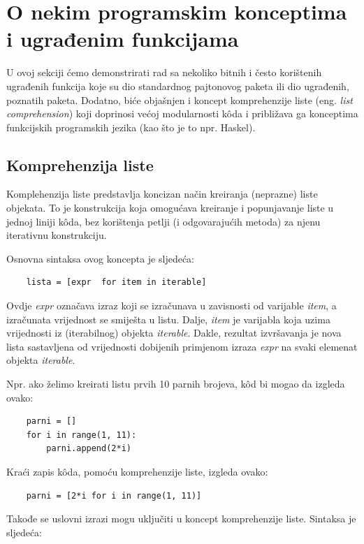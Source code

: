 \section{O nekim programskim konceptima i ugrađenim funkcijama} \label{sec:concepts-pyhton}

U ovoj sekciji ćemo demonstrirati rad sa nekoliko bitnih i često korištenih ugrađenih funkcija koje su dio standardnog pajtonovog paketa ili dio ugrađe\-nih, poznatih paketa. Dodatno, biće objašnjen i koncept komprehe\-nzije liste (eng. \textit{list comprehension}) koji  doprinosi većoj modularnosti k\^oda i približava ga konceptima funkcijskih programskih jezika (kao što je to npr. Haskel). 

\subsection{Komprehenzija liste}

Komplehenzija liste predstavlja koncizan način kreiranja (neprazne) liste objekata. To je konstrukcija koja omogućava kreiranje i popunja\-vanje liste u jednoj liniji k\^oda, bez korištenja petlji (i odgovarajućih metoda) za njenu iterativnu konstrukciju.

Osnovna sintaksa ovog koncepta je sljedeća:

\begin{verbatim}
	lista = [expr  for item in iterable]
\end{verbatim}
Ovdje \textit{expr} označava izraz koji se izračunava u zavisnosti od varijable  \textit{item}, a izračunata vrijednost se smiješta u listu.
Dalje, \textit{item} je varijabla koja  uzima vrijednosti iz (iterabilnog) objekta \textit{iterable}.  Dakle, rezultat izvršavanja je nova lista sastavljena od  vrijednosti dobijenih primjenom izraza  \textit{expr} na svaki elemenat objekta \textit{iterable}.

Npr. ako želimo kreirati listu prvih 10 parnih brojeva, k\^od bi mogao da izgleda ovako:

\begin{verbatim}
	parni = []
	for i in range(1, 11):
	    parni.append(2*i)
\end{verbatim}

Kraći zapis k\^oda, pomoću komprehenzije liste, izgleda ovako:


\begin{verbatim}
	parni = [2*i for i in range(1, 11)]
\end{verbatim}
Takođe se  uslovni izrazi  mogu uključiti u koncept komprehenzije liste. Sintaksa je sljedeća:

